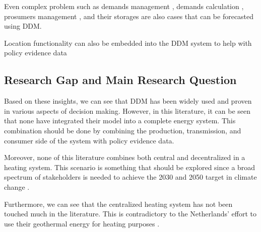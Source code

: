Even complex problem such as demands management \citep{Zhou2016BigInsights,Nashawi2010ForecastingModel,Costanzo2016ExperimentalSystem,Bassamzadeh2017MultiscaleNetworks,Kazmi2016GeneralizableNZEB,Bukhsh2018TowardsGrid, Leurs2016BeyondUnit, Filipe2019Data-drivenStation, Mbuwir2018Self-learningMicrogrid, Khezeli2016Data-drivenResponse}, demands calculation \citep{ONeill2016DevelopmentPerformance, Kontokosta2015ModelingPolicy, Nutkiewicz2017Data-drivenWorkflow, Nutkiewicz2018Data-drivenWorkflow, Biondi2016TheCase, Niemierko2019AData, Ameyaw2018SectoralTechnique, Papadopoulos2017SpatialData, Shah2018RegulatoryBarbuda, Contreras-Ocana2018TractableData, Yu2017PosterUSA, Jia2017PlanningBeijing}, prosumers management \citep{Mbuwir2017BatteryLearning, Mbuwir2018Self-learningMicrogrid, Leurs2016BeyondUnit}, and their storages \citep{Mbuwir2017BatteryLearning, Wu2019OptimalApproach, Shang2020StochasticApproach} are also cases that can be forecasted using DDM. 

Location functionality \citep{Pevec2018AInfrastructure, Lee2016AdoptionSearch-queries, Nutkiewicz2017Data-drivenWorkflow, Papadopoulos2017SpatialData, Wang2020ASources} can also be embedded into the DDM system to help with policy evidence data  \citep{Lee2016AdoptionSearch-queries, Musella2016MappingModels, Dundon2015TheRegulators, Niemierko2019AData} 



\subsection{Research Gap and Main Research Question}
Based on these insights, we can see that DDM has been widely used and proven in various aspects of decision making. However, in this literature, it can be seen that none have integrated their model into a complete energy system. This combination should be done by combining the production, transmission, and consumer side of the system with policy evidence data. 

Moreover, none of this literature combines both central and decentralized in a heating system. This scenario is something that should be explored since a broad spectrum of stakeholders is needed to achieve the 2030 and 2050 target in climate change \citep{GovernmentoftheNetherlands2019ClimateAffordable}.

Furthermore, we can see that the centralized heating system has not been touched much in the literature. This is contradictory to the Netherlands' effort to use their geothermal energy for heating purposes \citep{GovernmentoftheNetherlands2019ClimateAffordable}.

